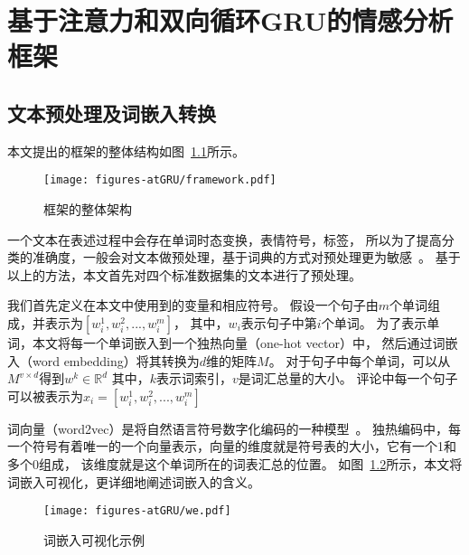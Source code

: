 
\chapter{基于注意力和双向循环GRU的情感分析框架}

\section{文本预处理及词嵌入转换}
本文提出的框架的整体结构如图~\ref{fig:fig1}所示。
\begin{figure}[h!]
    \centering
    \texttt{[image: figures-atGRU/framework.pdf]}
    \caption{框架的整体架构}
    \label{fig:fig1}
\end{figure}

一个文本在表述过程中会存在单词时态变换，表情符号，标签，
所以为了提高分类的准确度，一般会对文本做预处理，基于词典的方式对预处理更为敏感~。
基于以上的方法，本文首先对四个标准数据集的文本进行了预处理。

我们首先定义在本文中使用到的变量和相应符号。
假设一个句子由${m}$个单词组成，并表示为${\left[w_{i}^{1},w_{i}^{2},...,w_{i}^{m}\right]}$，
其中，${w_{i}}$表示句子中第${i}$个单词。
为了表示单词，本文将每一个单词嵌入到一个独热向量（one-hot vector）中，
然后通过词嵌入（word embedding）将其转换为${d}$维的矩阵${M}$。
对于句子中每个单词，可以从${M^{v\times d}}$得到${w^{k}\in \mathbb{R}^{d}}$
其中，${k}$表示词索引，${v}$是词汇总量的大小。
评论中每一个句子可以被表示为${x_{i}=\left[w_{i}^{1},w_{i}^{2},...,w_{i}^{m}\right]}$

词向量（word2vec）是将自然语言符号数字化编码的一种模型~。
独热编码中，每一个符号有着唯一的一个向量表示，向量的维度就是符号表的大小，它有一个1和多个0组成，
该维度就是这个单词所在的词表汇总的位置。
如图~\ref{fig:we}所示，本文将词嵌入可视化，更详细地阐述词嵌入的含义。
\begin{figure}[h!]
    \centering
    \texttt{[image: figures-atGRU/we.pdf]}
    \caption{词嵌入可视化示例}
    \label{fig:we}
\end{figure}

